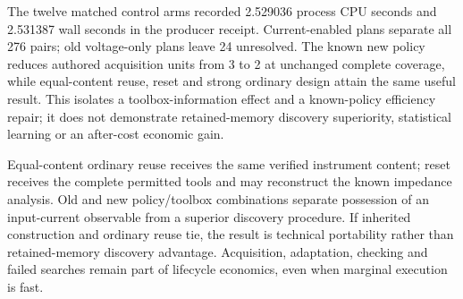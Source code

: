 \documentclass[10pt,letterpaper]{article}
\begin{document}
The twelve matched control arms recorded 2.529036 process CPU seconds and 2.531387 wall seconds in the producer receipt. Current-enabled plans separate all 276 pairs; old voltage-only plans leave 24 unresolved. The known new policy reduces authored acquisition units from 3 to 2 at unchanged complete coverage, while equal-content reuse, reset and strong ordinary design attain the same useful result. This isolates a toolbox-information effect and a known-policy efficiency repair; it does not demonstrate retained-memory discovery superiority, statistical learning or an after-cost economic gain.\par
Equal-content ordinary reuse receives the same verified instrument content; reset receives the complete permitted tools and may reconstruct the known impedance analysis. Old and new policy/toolbox combinations separate possession of an input-current observable from a superior discovery procedure. If inherited construction and ordinary reuse tie, the result is technical portability rather than retained-memory discovery advantage. Acquisition, adaptation, checking and failed searches remain part of lifecycle economics, even when marginal execution is fast.\par
\end{document}

